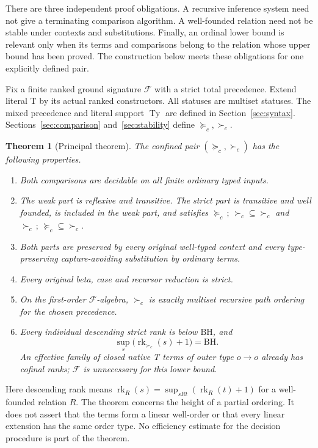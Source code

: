 \documentclass[11pt,a4paper]{article}
\newtheorem{theorem}{Theorem}[section]
\theoremstyle{definition}
\DeclareMathOperator{\Ty}{Ty}
\DeclareMathOperator{\rk}{rk}
\newcommand{\BH}{\mathrm{BH}}
\newcommand{\cw}{\succeq_c}
\newcommand{\cs}{\succ_c}
\begin{document}
There are three independent proof obligations. A recursive inference
system need not give a terminating comparison algorithm. A well-founded
relation need not be stable under contexts and substitutions. Finally,
an ordinal lower bound is relevant only when its terms and comparisons
belong to the relation whose upper bound has been proved. The construction
below meets these obligations for one explicitly defined pair.

Fix a finite ranked ground signature $\mathcal F$ with a strict total
precedence. Extend literal T by its actual ranked constructors. All statuses
are multiset statuses. The mixed precedence and literal support $\Ty$
are defined in Section~\ref{sec:syntax}. Sections~\ref{sec:comparison}
and~\ref{sec:stability} define $\cw,\cs$.

\begin{theorem}[Principal theorem]\label{thm:main}
The confined pair $(\cw,\cs)$ has the following properties.
\begin{enumerate}
\item Both comparisons are decidable on all finite ordinary typed inputs.
\item The weak part is reflexive and transitive. The strict part is
transitive and well founded, is included in the weak part, and satisfies
$\cw\,;\,\cs\subseteq\cs$ and $\cs\,;\,\cw\subseteq\cs$.
\item Both parts are preserved by every original well-typed context and
every type-preserving capture-avoiding substitution by ordinary terms.
\item Every original beta, case and recursor reduction is strict.
\item On the first-order $\mathcal F$-algebra, $\cs$ is exactly multiset
recursive path ordering for the chosen precedence.
\item Every individual descending strict rank is below $\BH$, and
\[
 \sup_s\bigl(\rk_{\cs}(s)+1\bigr)=\BH.
\]
An effective family of closed native T terms of outer type $o\to o$
already has cofinal ranks; $\mathcal F$ is unnecessary for this lower bound.
\end{enumerate}
\end{theorem}

Here descending rank means
$\rk_R(s)=\sup_{sRt}(\rk_R(t)+1)$ for a well-founded relation $R$.
The theorem concerns the height of a partial ordering. It does not assert
that the terms form a linear well-order or that every linear extension
has the same order type. No efficiency estimate for the decision procedure
is part of the theorem.
\end{document}
